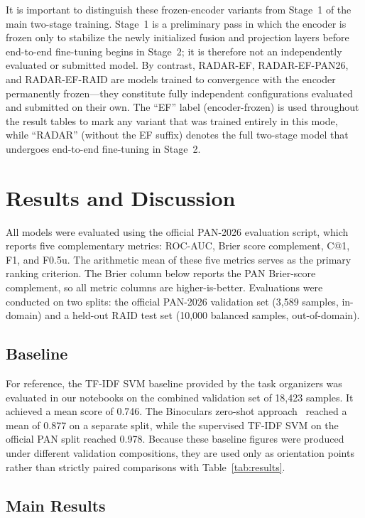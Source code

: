 \documentclass[]{ceurart}
\begin{document}
It is important to distinguish these frozen-encoder variants from Stage~1 of the main two-stage training. Stage~1 is a preliminary pass in which the encoder is frozen only to stabilize the newly initialized fusion and projection layers before end-to-end fine-tuning begins in Stage~2; it is therefore not an independently evaluated or submitted model. By contrast, RADAR-EF, RADAR-EF-PAN26, and RADAR-EF-RAID are models trained to convergence with the encoder permanently frozen---they constitute fully independent configurations evaluated and submitted on their own. The ``EF'' label (encoder-frozen) is used throughout the result tables to mark any variant that was trained entirely in this mode, while ``RADAR'' (without the EF suffix) denotes the full two-stage model that undergoes end-to-end fine-tuning in Stage~2.


\section{Results and Discussion}


All models were evaluated using the official PAN-2026 evaluation script, which
reports five complementary metrics: ROC-AUC, Brier score complement, C@1, F1,
and F0.5u. The arithmetic mean of these five metrics serves as the primary
ranking criterion. The Brier column below reports the PAN Brier-score
complement, so all metric columns are higher-is-better. Evaluations were
conducted on two splits: the official PAN-2026 validation set (3,589 samples,
in-domain) and a held-out RAID test set (10,000 balanced samples,
out-of-domain).

\subsection{Baseline}

For reference, the TF-IDF SVM baseline provided by the task organizers was
evaluated in our notebooks on the combined validation set of 18,423 samples. It
achieved a mean score of 0.746. The Binoculars zero-shot
approach~\cite{hans2024binoculars} reached a mean of 0.877 on a separate
split, while the supervised TF-IDF SVM on the official PAN split reached 0.978.
Because these baseline figures were produced under different validation
compositions, they are used only as orientation points rather than strictly
paired comparisons with Table~\ref{tab:results}.

\subsection{Main Results}
\end{document}
